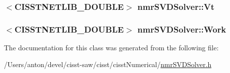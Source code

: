 \subsubsection[{Vt}]{$<$C\+I\+S\+S\+T\+N\+E\+T\+L\+I\+B\+\_\+\+D\+O\+U\+B\+L\+E$>$ nmr\+S\+V\+D\+Solver\+::\+Vt\hspace{0.3cm}{\ttfamily [protected]}}\label{classnmr_s_v_d_solver_a095a57197ba4c316b6761b25547b38f0}
\hypertarget{classnmr_s_v_d_solver_af78f509d3f0c674618f1d40c07c7fdc0}{}
\subsubsection[{Work}]{$<$C\+I\+S\+S\+T\+N\+E\+T\+L\+I\+B\+\_\+\+D\+O\+U\+B\+L\+E$>$ nmr\+S\+V\+D\+Solver\+::\+Work\hspace{0.3cm}{\ttfamily [protected]}}\label{classnmr_s_v_d_solver_af78f509d3f0c674618f1d40c07c7fdc0}


The documentation for this class was generated from the following file\+:\begin{DoxyCompactItemize}
\item 
/\+Users/anton/devel/cisst-\/saw/cisst/cisst\+Numerical/\hyperlink{nmr_s_v_d_solver_8h}{nmr\+S\+V\+D\+Solver.\+h}\end{DoxyCompactItemize}
